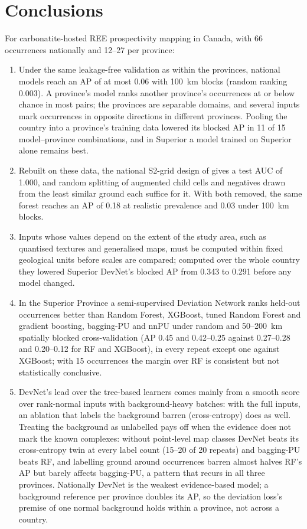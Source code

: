 \documentclass[pdflatex,sn-apa]{sn-jnl}
\begin{document}
\section{Conclusions}\label{sec:conclusions}

For carbonatite-hosted REE prospectivity mapping in Canada, with 66 occurrences nationally and 12--27 per province:
\begin{enumerate}
\item Under the same leakage-free validation as within the provinces, national models reach an AP of at most 0.06 with 100~km blocks (random ranking 0.003). A province's model ranks another province's occurrences at or below chance in most pairs; the provinces are separable domains, and several inputs mark occurrences in opposite directions in different provinces. Pooling the country into a province's training data lowered its blocked AP in 11 of 15 model--province combinations, and in Superior a model trained on Superior alone remains best.
\item Rebuilt on these data, the national S2-grid design of \citet{Parsa2024} gives a test AUC of 1.000, and random splitting of augmented child cells and negatives drawn from the least similar ground each suffice for it. With both removed, the same forest reaches an AP of 0.18 at realistic prevalence and 0.03 under 100~km blocks.
\item Inputs whose values depend on the extent of the study area, such as quantised textures and generalised maps, must be computed within fixed geological units before scales are compared; computed over the whole country they lowered Superior DevNet's blocked AP from 0.343 to 0.291 before any model changed.
\item In the Superior Province a semi-supervised Deviation Network ranks held-out occurrences better than Random Forest, XGBoost, tuned Random Forest and gradient boosting, bagging-PU and nnPU under random and 50--200~km spatially blocked cross-validation (AP 0.45 and 0.42--0.25 against 0.27--0.28 and 0.20--0.12 for RF and XGBoost), in every repeat except one against XGBoost; with 15 occurrences the margin over RF is consistent but not statistically conclusive.
\item DevNet's lead over the tree-based learners comes mainly from a smooth score over rank-normal inputs with background-heavy batches: with the full inputs, an ablation that labels the background barren (cross-entropy) does as well. Treating the background as unlabelled pays off when the evidence does not mark the known complexes: without point-level map classes DevNet beats its cross-entropy twin at every label count (15--20 of 20 repeats) and bagging-PU beats RF, and labelling ground around occurrences barren almost halves RF's AP but barely affects bagging-PU, a pattern that recurs in all three provinces. Nationally DevNet is the weakest evidence-based model; a background reference per province doubles its AP, so the deviation loss's premise of one normal background holds within a province, not across a country.

\end{enumerate}
\end{document}
